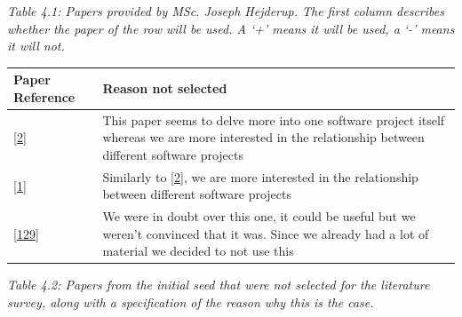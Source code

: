\documentclass[]{book}
\begin{document}
\emph{Table 4.1: Papers provided by MSc. Joseph Hejderup. The first
column describes whether the paper of the row will be used. A `+' means
it will be used, a `-' means it will not.}

\begin{longtable}[]{@{}ll@{}}
\toprule
\begin{minipage}[b]{0.05\columnwidth}\raggedright\strut
Paper Reference\strut
\end{minipage} & \begin{minipage}[b]{0.05\columnwidth}\raggedright\strut
Reason not selected\strut
\end{minipage}\tabularnewline
\midrule
\endhead
\begin{minipage}[t]{0.05\columnwidth}\raggedright\strut
{[}\protect\hyperlink{ref-Abate2009}{2}{]}\strut
\end{minipage} & \begin{minipage}[t]{0.05\columnwidth}\raggedright\strut
This paper seems to delve more into one software project itself whereas
we are more interested in the relationship between different software
projects\strut
\end{minipage}\tabularnewline
\begin{minipage}[t]{0.05\columnwidth}\raggedright\strut
{[}\protect\hyperlink{ref-Abate2011}{1}{]}\strut
\end{minipage} & \begin{minipage}[t]{0.05\columnwidth}\raggedright\strut
Similarly to {[}\protect\hyperlink{ref-Abate2009}{2}{]}, we are more
interested in the relationship between different software projects\strut
\end{minipage}\tabularnewline
\begin{minipage}[t]{0.05\columnwidth}\raggedright\strut
{[}\protect\hyperlink{ref-Mens2013}{129}{]}\strut
\end{minipage} & \begin{minipage}[t]{0.05\columnwidth}\raggedright\strut
We were in doubt over this one, it could be useful but we weren't
convinced that it was. Since we already had a lot of material we decided
to not use this\strut
\end{minipage}\tabularnewline
\bottomrule
\end{longtable}

\emph{Table 4.2: Papers from the initial seed that were not selected for
the literature survey, along with a specification of the reason why this
is the case.}
\end{document}

